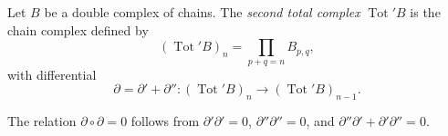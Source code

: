 Let $B$ be a double complex of chains. The \emph{second total complex} $\operatorname{Tot}' B$ is the chain complex defined by
$$(\operatorname{Tot}' B)_n = \prod_{p+q=n} B_{p,q},$$
with differential
$$\partial = \partial' + \partial'' : (\operatorname{Tot}' B)_n \rightarrow (\operatorname{Tot}' B)_{n-1}.$$

The relation $\partial \circ \partial = 0$ follows from $\partial' \partial' = 0$, $\partial'' \partial'' = 0$, and $\partial'' \partial' + \partial' \partial'' = 0$.
